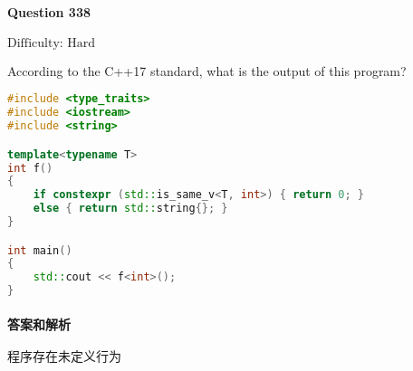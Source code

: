 \documentclass{article}
\begin{document}
	
	\paragraph*{Question 338} $\boxed{\text{Difficulty: Hard}} $			
	
	According to the C++17 standard, what is the output of this program?
	
	\begin{lstlisting}[language=C++]  		
#include <type_traits>
#include <iostream>
#include <string>

template<typename T>
int f()
{
	if constexpr (std::is_same_v<T, int>) { return 0; }
	else { return std::string{}; }
}

int main()
{
	std::cout << f<int>();
}
	\end{lstlisting}
	
	
	\paragraph*{答案和解析} $\boxed{\text{程序存在未定义行为}} $
	
\end{document}
